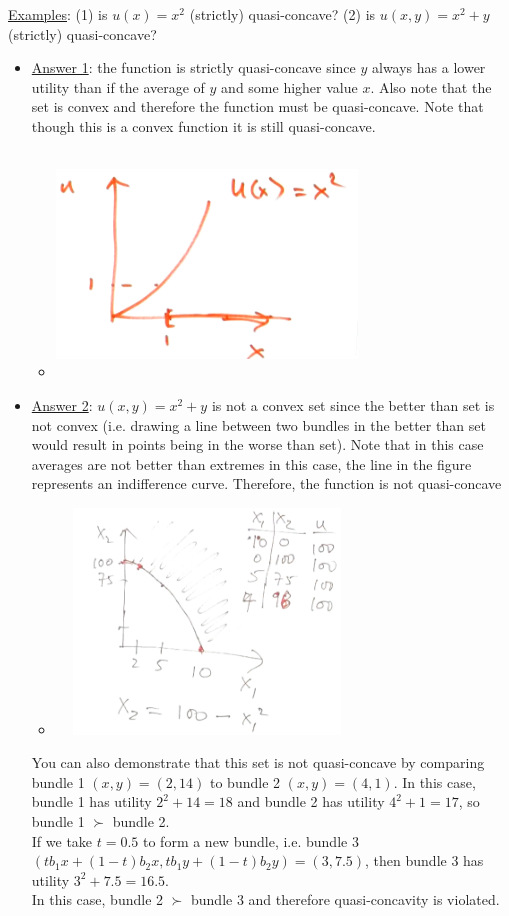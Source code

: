 \documentclass{article}
\begin{document}
  \par
  \underline{Examples}: (1) is $u(x) = x^{2}$ (strictly) quasi-concave? (2) is $u(x,y) = x^{2} + y$ (strictly) quasi-concave?
  \begin{itemize}
    \item  \underline{Answer 1}: the function is strictly quasi-concave since $y$ always has a lower utility than if the average of $y$ and some higher value $x$. Also note that the set is convex and therefore the function must be quasi-concave. Note that though this is a convex function it is still quasi-concave.
    \begin{itemize}
      \item  \includegraphics[width=8cm, height=6cm]{pic19}
    \end{itemize}
    \item  \underline{Answer 2}: $u(x,y) = x^{2} + y$ is not a convex set since the better than set is not convex (i.e. drawing a line between two bundles in the better than set would result in points being in the worse than set). Note that in this case averages are not better than extremes in this case, the line in the figure represents an indifference curve. Therefore, the function is not quasi-concave
    \begin{itemize}
      \item  \includegraphics[width=8cm, height=6cm]{pic18}
    \end{itemize}
    You can also demonstrate that this set is not quasi-concave by comparing bundle 1 $(x,y) = (2, 14)$ to bundle 2 $(x,y) = (4, 1)$. In this case, bundle 1 has utility $2^{2} + 14 = 18$ and bundle 2 has utility $4^2 + 1 = 17$, so bundle 1 $\succ$ bundle 2. \\ If we take $t=0.5$ to form a new bundle, i.e. bundle 3 $(tb_{1}x + (1-t)b_{2}x, tb_{1}y + (1-t)b_{2}y) = (3, 7.5)$, then bundle 3 has utility $3^{2} + 7.5 = 16.5$. \\ In this case, bundle 2 $\succ$ bundle 3 and therefore quasi-concavity is violated.
  \end{itemize}
  \par
\vspace{6mm}
\end{document}
